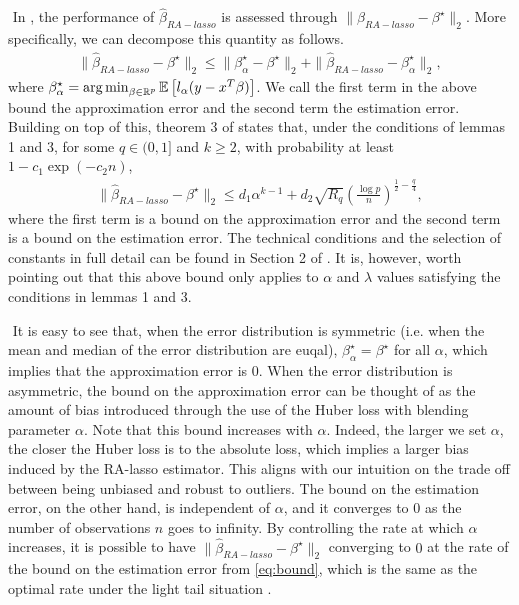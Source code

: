 $ $\newline
In \citet{fan2017estimation}, the performance of $\hat{\beta}_{RA-lasso}$ is assessed through $\| \hat{\beta}_{RA-lasso} - \beta^\star \|_2$. More specifically, we can decompose this quantity as follows.
\begin{align*}
\| \hat{\beta}_{RA-lasso} - \beta^\star \|_2 \leq \| \beta^\star_\alpha - \beta^\star \|_2 + \| \hat{\beta}_{RA-lasso} - \beta^\star_\alpha \|_2,
\end{align*}
where $\beta^\star_\alpha = \argmin_{\beta\in\mathbb{R}^p}\mathbb{E}\left[ l_\alpha (y - x^T\beta) \right]$. We call  the first term in the above bound the approximation error and the second term the estimation error. Building on top of this, theorem 3 of \citet{fan2017estimation} states that, under the conditions of lemmas 1 and 3, for some $q\in(0,1]$ and $k\geq2$, with probability at least $1-c_1\exp(-c_2n)$,
\begin{align}
\| \hat{\beta}_{RA-lasso} - \beta^\star \|_2 \leq d_1\alpha^{k-1} + d_2\sqrt{R_q}\left( \frac{\log p}{n} \right)^{\frac{1}{2} - \frac{q}{4}}, \label{eq:bound}
\end{align}
where the first term is a bound on the approximation error and the second term is a bound on the estimation error. The technical conditions and the selection of constants in full detail can be found in Section 2 of \citet{fan2017estimation}. It is, however, worth pointing out that this above bound only applies to $\alpha$ and $\lambda$ values satisfying the conditions in lemmas 1 and 3.

$ $\newline
It is easy to see that, when the error distribution is symmetric (i.e. when the mean and median of the error distribution are euqal), $\beta^\star_\alpha = \beta^\star$ for all $\alpha$, which implies that the approximation error is $0$. When the error distribution is asymmetric, the bound on the approximation error can be thought of as the amount of bias introduced through the use of the Huber loss with blending parameter $\alpha$. Note that this bound increases with $\alpha$. Indeed, the larger we set $\alpha$, the closer the Huber loss is to the absolute loss, which implies a larger bias induced by the RA-lasso estimator. This aligns with our intuition on the trade off between being unbiased and robust to outliers. The bound on the estimation error, on the other hand, is independent of $\alpha$, and it converges to $0$ as the number of observations $n$ goes to infinity. By controlling the rate at which $\alpha$ increases, it is possible to have $\| \hat{\beta}_{RA-lasso} - \beta^\star \|_2$ converging to $0$ at the rate of the bound on the estimation error from \cref{eq:bound}, which is the same as the optimal rate under the light tail situation \cite{raskutti2011minimax}.

